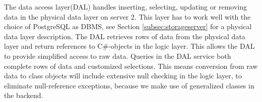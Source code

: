 The data access layer(DAL) handles inserting, selecting, updating or removing data in the physical data layer on server 2. This layer has to work well with the choice of PostgreSQL as DBMS, see Section \ref{subsec:storageserver} for a physical data layer description. The DAL retrieves rows of data from the physical data layer and return references to C\#-objects in the logic layer. This allows the DAL to provide simplified access to raw data. Queries in the DAL service both complete rows of data and customized selections. This means conversion from raw data to class objects will include extensive null checking in the logic layer, to eliminate null-reference exceptions, because we make use of generalized classes in the backend. 